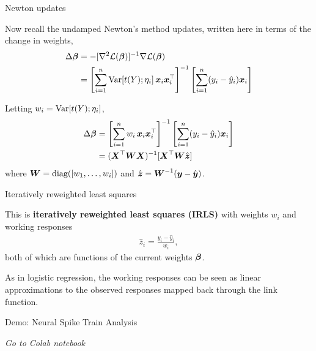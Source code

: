 \documentclass[aspectratio=169]{beamer}
\begin{document}
\begin{frame}[t,allowframebreaks]{Newton updates}\label{newton-updates}

Now recall the undamped Newton's method updates, written here in terms
of the change in weights, \begin{align*}
    \Delta \boldsymbol{\beta} &= - [\nabla^2 \mathcal{L}(\boldsymbol{\beta})]^{-1} \nabla \mathcal{L}(\boldsymbol{\beta}) \\
    &= \left[\sum_{i=1}^n \textrm{Var}[t(Y); \eta_i] \, \boldsymbol{x}_i \boldsymbol{x}_i^\top \right]^{-1} \left[\sum_{i=1}^n (y_i - \hat{y}_i) \boldsymbol{x}_i \right]
\end{align*}

Letting \(w_i = \textrm{Var}[t(Y); \eta_i]\), \begin{align*}
    \Delta \boldsymbol{\beta} &=
    \left[\sum_{i=1}^n w_i \, \boldsymbol{x}_i \boldsymbol{x}_i^\top \right]^{-1} \left[ \sum_{i=1}^n (y_i - \hat{y}_i) \boldsymbol{x}_i \right] \\
    &= (\boldsymbol{X}^\top \boldsymbol{W} \boldsymbol{X})^{-1} [\boldsymbol{X}^\top \boldsymbol{W} \hat{\boldsymbol{z}}]
\end{align*} where \(\boldsymbol{W} = \textrm{diag}([w_1, \ldots, w_i])\) and
\(\hat{\boldsymbol{z}} = \boldsymbol{W}^{-1} (\boldsymbol{y} - \hat{\boldsymbol{y}})\).
\end{frame}

\begin{frame}[t,allowframebreaks]{Iteratively reweighted least
squares}\label{iteratively-reweighted-least-squares}

This is \textbf{iteratively reweighted least squares (IRLS)} with
weights \(w_i\) and working responses \begin{align*}
\hat{z}_i = \frac{y_i - \hat{y}_i}{w_i},
\end{align*} both of which are functions of the current weights
\(\boldsymbol{\beta}\).

As in logistic regression, the working responses can be seen as linear
approximations to the observed responses mapped back through the link
function.
\end{frame}

\begin{frame}[allowframebreaks]{Demo: Neural Spike Train
Analysis}\label{demo-neural-spike-train-analysis}

\begin{center}
    \textit{Go to Colab notebook}
\end{center}
\end{frame}
\end{document}
